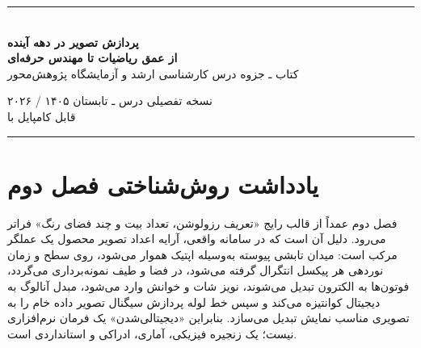 \documentclass[12pt,openany,oneside]{book}
\begin{document}
\begin{titlepage}
\centering
\vspace*{1cm}
{\color{DeepBlue}\rule{0.9\textwidth}{1.1pt}}\\[1.05cm]
{\Huge\bfseries پردازش تصویر در دهه آینده\\[0.3cm]}
{\LARGE\bfseries از عمق ریاضیات تا مهندس حرفه‌ای\\[0.9cm]}
{\Large کتاب ـ جزوه درس کارشناسی ارشد و آزمایشگاه پژوهش‌محور\\[1.2cm]}


\vfill
{\large نسخه تفصیلی درس ـ تابستان ۱۴۰۵ / ۲۰۲۶}\\[0.4cm]
{\normalsize قابل کامپایل با }\\[0.8cm]
{\color{DeepBlue}\rule{0.9\textwidth}{1.1pt}}
\end{titlepage}

\frontmatter
\chapter*{یادداشت روش‌شناختی فصل دوم}

فصل دوم عمداً از قالب رایج «تعریف رزولوشن، تعداد بیت و چند فضای رنگ» فراتر می‌رود.
دلیل آن است که در سامانه واقعی، آرایه اعداد تصویر محصول یک عملگر مرکب است: میدان تابشی
پیوسته به‌وسیله اپتیک هموار می‌شود، روی سطح و زمان نوردهی هر پیکسل انتگرال گرفته می‌شود،
در فضا و طیف نمونه‌برداری می‌گردد، فوتون‌ها به الکترون تبدیل می‌شوند، نویز شات و خوانش
وارد می‌شود، مبدل آنالوگ به دیجیتال کوانتیزه می‌کند و سپس خط لوله پردازش سیگنال تصویر
داده خام را به تصویری مناسب نمایش تبدیل می‌سازد. بنابراین «دیجیتالی‌شدن» یک فرمان نرم‌افزاری
نیست؛ یک زنجیره فیزیکی، آماری، ادراکی و استانداردی است.
\end{document}
